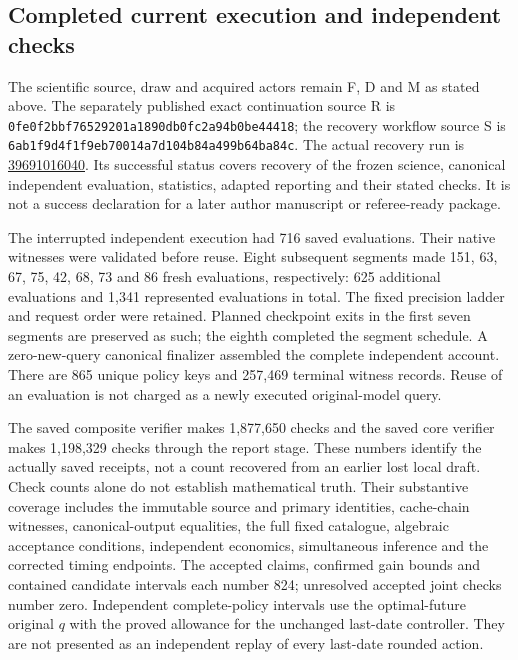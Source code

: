 \subsection{Completed current execution and independent checks}
The scientific source, draw and acquired actors remain F, D and M as stated
above. The separately published exact continuation source R is
\nolinkurl{0fe0f2bbf76529201a1890db0fc2a94b0be44418}; the recovery
workflow source S is
\nolinkurl{6ab1f9d4f1f9eb70014a7d104b84a499b64ba84c}.
The actual recovery run is
\href{https://github.com/TrillionniumFoundation/NBO/actions/runs/39691016040}{39691016040}.
Its successful status covers recovery of the frozen science, canonical
independent evaluation, statistics, adapted reporting and their stated
checks. It is not a success declaration for a later author manuscript or
referee-ready package.

The interrupted independent execution had 716 saved evaluations. Their
native witnesses were validated before reuse. Eight subsequent segments
made 151, 63, 67, 75, 42, 68, 73 and 86 fresh evaluations, respectively:
625 additional evaluations and 1,341 represented evaluations in total.
The fixed precision ladder and request order were retained. Planned
checkpoint exits in the first seven segments are preserved as such;
the eighth completed the segment schedule. A zero-new-query canonical
finalizer assembled the complete independent account. There are 865 unique
policy keys and 257,469 terminal witness records. Reuse of an evaluation
is not charged as a newly executed original-model query.

The saved composite verifier makes 1,877,650 checks and the saved core
verifier makes 1,198,329 checks through the report stage. These numbers
identify the actually saved receipts, not a count recovered from an earlier
lost local draft. Check counts alone do not establish mathematical truth.
Their substantive coverage includes the immutable source and primary
identities, cache-chain witnesses, canonical-output equalities, the full
fixed catalogue, algebraic acceptance conditions, independent economics,
simultaneous inference and the corrected timing endpoints. The accepted
claims, confirmed gain bounds and contained candidate intervals each
number 824; unresolved accepted joint checks number zero. Independent
complete-policy intervals use the optimal-future original $q$ with the
proved allowance for the unchanged last-date controller. They are not
presented as an independent replay of every last-date rounded action.

